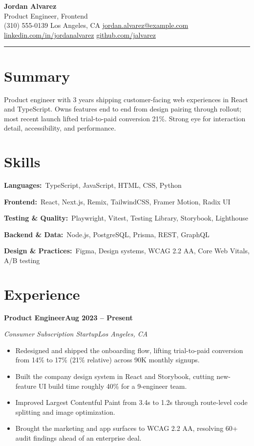\documentclass[letterpaper,10pt]{article}
\makeatletter
\newcommand{\csep}{\hspace{5pt}\textbar\hspace{5pt}}
\newcommand{\rRole}[4]{%
  \vspace{3pt}%
  \noindent\textbf{#1}\hfill\textbf{#4}\par
  \noindent\textit{\color{muted}#2}\hfill\textit{\color{muted}#3}\par
  \vspace{1pt}%
}
\newcommand{\rSkill}[2]{\noindent\textbf{#1:}\ #2\par\vspace{2pt}}
\newenvironment{rBullets}
  {\begin{itemize}[leftmargin=13pt,itemsep=2pt,parsep=0pt,topsep=2pt,
                   partopsep=0pt,label=\textbullet]}
  {\end{itemize}}
\def\name{Jordan Alvarez}
\def\role{Product Engineer, Frontend}
\def\phone{(310) 555-0139}
\def\location{Los Angeles, CA}
\def\email{jordan.alvarez@example.com}
\def\LinkedIn{jordanalvarez}
\def\github{jalvarez}
\makeatother
\begin{document}
\begin{center}
  {\LARGE\bfseries\color{bodytext}\name}\\[3pt]
  {\large\color{accent}\role}\\[5pt]
  {\small
    \phone\csep
    \location\csep
    \href{mailto:\email}{\email}\csep
    \href{https://linkedin.com/in/\LinkedIn}{linkedin.com/in/\LinkedIn}\csep
    \href{https://github.com/\github}{github.com/\github}}
\end{center}
\vspace{3pt}
{\color{accent}\rule{\linewidth}{1.6pt}}

\section{Summary}
Product engineer with 3 years shipping customer-facing web experiences in React
and TypeScript. Owns features end to end from design pairing through rollout;
most recent launch lifted trial-to-paid conversion 21\%. Strong eye for
interaction detail, accessibility, and performance.

\section{Skills}
\rSkill{Languages}{TypeScript, JavaScript, HTML, CSS, Python}
\rSkill{Frontend}{React, Next.js, Remix, TailwindCSS, Framer Motion, Radix UI}
\rSkill{Testing \& Quality}{Playwright, Vitest, Testing Library, Storybook, Lighthouse}
\rSkill{Backend \& Data}{Node.js, PostgreSQL, Prisma, REST, GraphQL}
\rSkill{Design \& Practices}{Figma, Design systems, WCAG 2.2 AA, Core Web Vitals, A/B testing}

\section{Experience}

\rRole{Product Engineer}{Consumer Subscription Startup}{Los Angeles, CA}{Aug 2023 -- Present}
\begin{rBullets}
  \item Redesigned and shipped the onboarding flow, lifting trial-to-paid conversion from 14\% to 17\% (21\% relative) across 90K monthly signups.
  \item Built the company design system in React and Storybook, cutting new-feature UI build time roughly 40\% for a 9-engineer team.
  \item Improved Largest Contentful Paint from 3.4s to 1.2s through route-level code splitting and image optimization.
  \item Brought the marketing and app surfaces to WCAG 2.2 AA, resolving 60+ audit findings ahead of an enterprise deal.
\end{rBullets}
\end{document}

